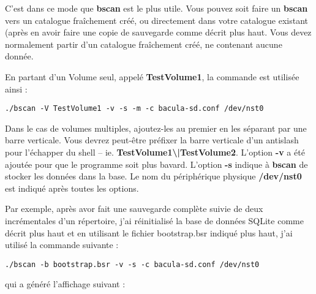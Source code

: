 C'est dans ce mode que {\bf bscan} est le plus utile. Vous pouvez soit faire un
{\bf bscan} vers un catalogue fraîchement créé, ou directement dans votre 
catalogue existant (après en avoir faire une copie de sauvegarde comme décrit
plus haut. Vous devez normalement partir d'un catalogue fraîchement créé, ne
contenant aucune donnée.

En partant d'un Volume seul, appelé {\bf TestVolume1}, la commande est utilisée
ainsi :

\footnotesize
\begin{verbatim}
./bscan -V TestVolume1 -v -s -m -c bacula-sd.conf /dev/nst0
\end{verbatim}
\normalsize

Dans le cas de volumes multiples, ajoutez-les au premier en les séparant par une
barre verticale. Vous devrez peut-être préfixer la barre verticale d'un
antislash pour l'échapper du shell -- ie. 
{\bf TestVolume1\textbackslash{}|TestVolume2}. L'option {\bf -v} a été ajoutée
pour que le programme soit plus bavard. L'option {\bf -s} indique à {\bf bscan}
de stocker les données dans la base. Le nom du périphérique physique 
{\bf /dev/nst0} est indiqué après toutes les options.

Par exemple, après avor fait une sauvegarde complète suivie de deux 
incrémentales d'un répertoire, j'ai réinitialisé la base de données SQLite comme
décrit plus haut et en utilisant le fichier bootstrap.bsr indiqué plus haut, 
j'ai utilisé la commande suivante :

\footnotesize
\begin{verbatim}
./bscan -b bootstrap.bsr -v -s -c bacula-sd.conf /dev/nst0
\end{verbatim}
\normalsize

qui a généré l'affichage suivant :

